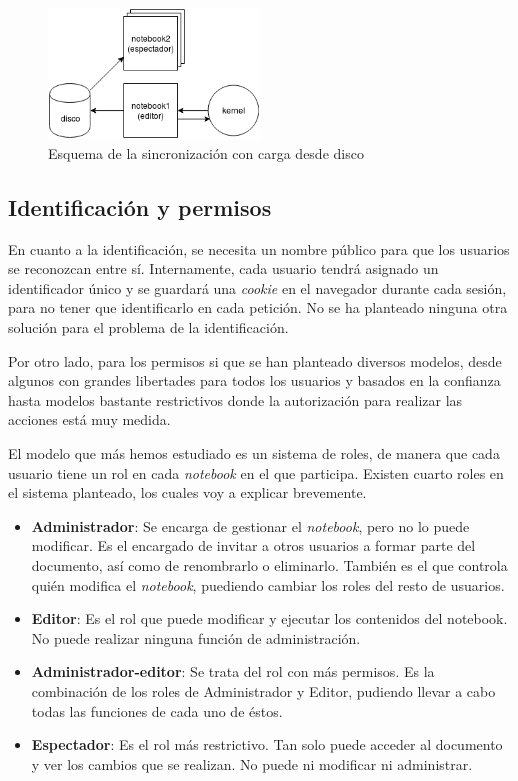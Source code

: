 \documentclass[11pt,spanish,listoffigures]{tfgetsinf}
\begin{document}
\begin{figure}[h]
	\centering
  	\includegraphics[width=0.5\textwidth]{JSON-sync.png}
  	\caption{Esquema de la sincronización con carga desde disco}
  	\label{fig:disk-scheme}
\end{figure}


\subsection{Identificación y permisos}
\label{subsec:identificacin-permisos}

En cuanto a la identificación, se necesita un nombre público para que los usuarios se reconozcan entre sí. Internamente, cada usuario tendrá asignado un identificador único y se guardará una \textit{\gls{cookie}} en el navegador durante cada sesión, para no tener que identificarlo en cada petición. No se ha planteado ninguna otra solución para el problema de la identificación.

Por otro lado, para los permisos si que se han planteado diversos modelos, desde algunos con grandes libertades para todos los usuarios y basados en la confianza hasta modelos bastante restrictivos donde la autorización para realizar las acciones está muy medida.

El modelo que más hemos estudiado es un sistema de roles, de manera que cada usuario tiene un rol en cada \textit{notebook} en el que participa. Existen cuarto roles en el sistema planteado, los cuales voy a explicar brevemente.

\begin{itemize}

\item \textbf{Administrador}: Se encarga de gestionar el \textit{notebook}, pero no lo puede modificar. Es el encargado de invitar a otros usuarios a formar parte del documento, así como de renombrarlo o eliminarlo. También es el que controla quién modifica el \textit{notebook}, puediendo cambiar los roles del resto de usuarios. 

\item \textbf{Editor}: Es el rol que puede modificar y ejecutar los contenidos del notebook. No puede realizar ninguna función de administración.

\item \textbf{Administrador-editor}: Se trata del rol con más permisos. Es la combinación de los roles de Administrador y Editor, pudiendo llevar a cabo todas las funciones de cada uno de éstos.

\item \textbf{Espectador}: Es el rol más restrictivo. Tan solo puede acceder al documento y ver los cambios que se realizan. No puede ni modificar ni administrar.

\end{itemize}
\end{document}
